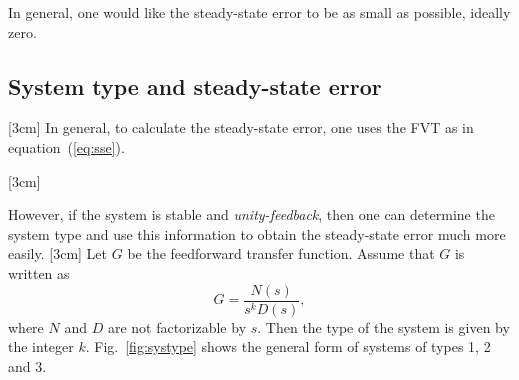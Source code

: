 \documentclass{scrreprt}
\theoremstyle{plain}
\theoremstyle{definition}
\theoremstyle{remark}
\begin{document}
In general, one would like the steady-state error to be as small as
possible, ideally zero.

\subsection{System type and steady-state error}

 [3cm]
In general, to calculate the steady-state error, one uses the FVT as
in equation~(\ref{eq:sse}).

\reversemarginpar
{}[3cm]

 However, if the system is stable and
\emph{unity-feedback}, then one can determine the system type and use
this information to obtain the steady-state error much more easily. 
\reversemarginpar
{}[3cm]
Let $G$ be the feedforward transfer function. Assume that $G$ is
written as
\[
G=\frac{N(s)}{s^kD(s)},
\]
where $N$ and $D$ are not factorizable by $s$. Then the type of the
system is given by the integer $k$. Fig.~\ref{fig:systype} shows the
general form of systems of types 1, 2 and 3.
\end{document}

